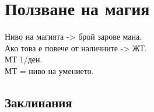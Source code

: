 \section{Ползване на магия}
Ниво на магията -> брой зарове мана.  \\
Ако това е повече от наличните -> ЖТ. \\
МТ 1/ден.                             \\
МТ = ниво на умението.                \\



\subsection{Заклинания} 







